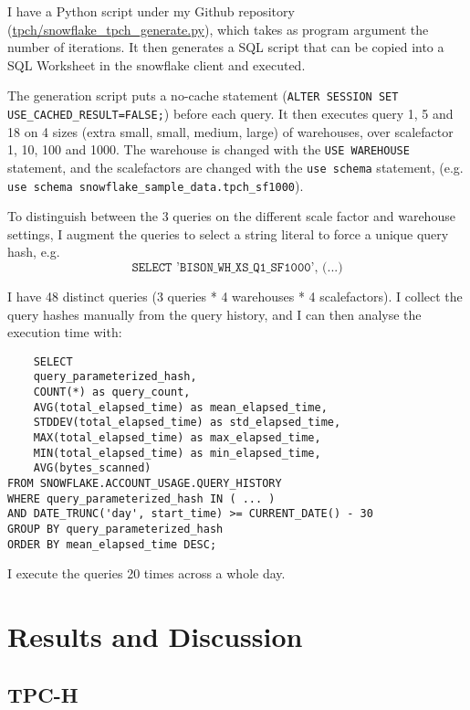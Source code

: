 \documentclass{article}
\begin{document}
\medskip \noindent I have a Python script under my Github repository (\url{tpch/snowflake_tpch_generate.py}), which takes as program argument the number of iterations. It then generates a SQL script that can be copied into a SQL Worksheet in the snowflake client and executed. 

\medskip \noindent The generation script puts a no-cache statement (\texttt{ALTER SESSION SET USE\_CACHED\_RESULT=FALSE;}) before each query. It then executes query 1, 5 and 18 on 4 sizes (extra small, small, medium, large) of warehouses, over scalefactor 1, 10, 100 and 1000. The warehouse is changed with the \texttt{USE WAREHOUSE} statement, and the scalefactors are changed with the \texttt{use schema} statement, (e.g. \texttt{use schema snowflake\_sample\_data.tpch\_sf1000}).

\medskip \noindent To distinguish between the 3 queries on the different scale factor and warehouse settings, I augment the queries to select a string literal to force a unique query hash, e.g. $$ \texttt{SELECT 'BISON\_WH\_XS\_Q1\_SF1000', (...)} $$

\medskip \noindent I have 48 distinct queries (3 queries * 4 warehouses * 4 scalefactors). I collect the query hashes manually from the query history, and I can then analyse the execution time with: 

\begin{verbatim}
    SELECT 
    query_parameterized_hash,
    COUNT(*) as query_count,
    AVG(total_elapsed_time) as mean_elapsed_time,
    STDDEV(total_elapsed_time) as std_elapsed_time,
    MAX(total_elapsed_time) as max_elapsed_time,
    MIN(total_elapsed_time) as min_elapsed_time,
    AVG(bytes_scanned)
FROM SNOWFLAKE.ACCOUNT_USAGE.QUERY_HISTORY
WHERE query_parameterized_hash IN ( ... )
AND DATE_TRUNC('day', start_time) >= CURRENT_DATE() - 30
GROUP BY query_parameterized_hash
ORDER BY mean_elapsed_time DESC;
\end{verbatim}

\noindent I execute the queries 20 times across a whole day. 


\section{Results and Discussion}

\FloatBarrier

\subsection{TPC-H}
\end{document}
